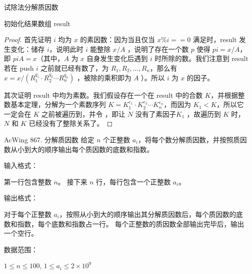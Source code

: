 \begin{algorithm}[H] %
    \caption{试除法分解质因数}
    \SetAlgoLined
    初始化结果数组 result \\

\end{algorithm}

\begin{proof}
    首先证明 $i$ 均为 $x$ 的素因数：因为当且仅当 $x \% i == 0$ 满足时，result 发生变化：储存 $i$，说明此时 $i$ 能整除 $x / A$ ，说明了存在一个数 $p$ 使得 $pi = x / A$，即 $piA = x$（其中，$A$ 为 $x$ 自身发生变化后遇到 $i$ 时所除的数。我们注意到 result 若在 push $i$ 之前就已经有数了，为 $R_1, R_2, \dots, R_n$，那么有 $x = x / (R_1^{q_1}\cdot R_2^{q_2}\cdots R_n^{q_n})$ ，被除的乘积即为 $A$ ）。所以 $i$ 为 $x$ 的因子。

    其次证明 result 中均为素数。我们假设存在一个在 result 中的合数 $K$，并根据整数基本定理，分解为一个素数序列 $K = K_1^{e_1}\cdot K_2^{e_2}\cdots K_n^{e_n}$，而因为 $K_1 < K$，所以它一定会在 $K$ 之前被遍历到，并令 ，即让 $N$ 没有了素因子$K_1$ ，故遍历到 $K$ 时，$N$ 和 $K$ 已经没有了整除关系了。
\end{proof}

\begin{titledbox}{AcWing 867. 分解质因数}
    给定 $n$ 个正整数 $a_i$，将每个数分解质因数，并按照质因数从小到大的顺序输出每个质因数的底数和指数。

    输入格式：

    第一行包含整数 $n$。 接下来 $n$ 行，每行包含一个正整数 $a_i$。

    输出格式：

    对于每个正整数 $a_i$，按照从小到大的顺序输出其分解质因数后，每个质因数的底数和指数，每个底数和指数占一行。 每个正整数的质因数全部输出完毕后，输出一个空行。

    数据范围：

    $1 \le n \le 100$, $1 \le a_i \le 2 \times 10^9$

    \begin{inputblock}
         \\
         \\
    \end{inputblock}
    \begin{outputblock}
         \\
         \\
        \\
         \\

    \end{outputblock}
\end{titledbox}

